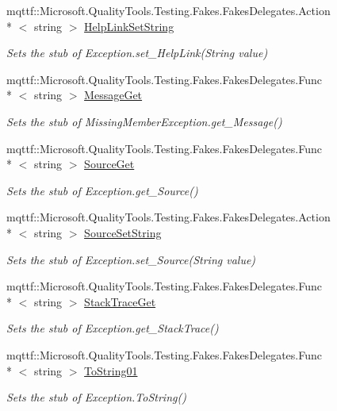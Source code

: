 \begin{DoxyCompactItemize}
mqttf\-::\-Microsoft.\-Quality\-Tools.\-Testing.\-Fakes.\-Fakes\-Delegates.\-Action\\*
$<$ string $>$ \hyperlink{class_system_1_1_fakes_1_1_stub_missing_member_exception_a69763328ffc3aea2fb6e02c0e23f6cc1}{Help\-Link\-Set\-String}
\begin{DoxyCompactList}\small\item\em Sets the stub of Exception.\-set\-\_\-\-Help\-Link(\-String value)\end{DoxyCompactList}\item 
mqttf\-::\-Microsoft.\-Quality\-Tools.\-Testing.\-Fakes.\-Fakes\-Delegates.\-Func\\*
$<$ string $>$ \hyperlink{class_system_1_1_fakes_1_1_stub_missing_member_exception_a75b800fc5f536649bbafb0e673e11ea7}{Message\-Get}
\begin{DoxyCompactList}\small\item\em Sets the stub of Missing\-Member\-Exception.\-get\-\_\-\-Message()\end{DoxyCompactList}\item 
mqttf\-::\-Microsoft.\-Quality\-Tools.\-Testing.\-Fakes.\-Fakes\-Delegates.\-Func\\*
$<$ string $>$ \hyperlink{class_system_1_1_fakes_1_1_stub_missing_member_exception_a4cbfa7a14df58a52470b7b51cec38220}{Source\-Get}
\begin{DoxyCompactList}\small\item\em Sets the stub of Exception.\-get\-\_\-\-Source()\end{DoxyCompactList}\item 
mqttf\-::\-Microsoft.\-Quality\-Tools.\-Testing.\-Fakes.\-Fakes\-Delegates.\-Action\\*
$<$ string $>$ \hyperlink{class_system_1_1_fakes_1_1_stub_missing_member_exception_a61f47a4ec94638d253e068b3ad78df64}{Source\-Set\-String}
\begin{DoxyCompactList}\small\item\em Sets the stub of Exception.\-set\-\_\-\-Source(\-String value)\end{DoxyCompactList}\item 
mqttf\-::\-Microsoft.\-Quality\-Tools.\-Testing.\-Fakes.\-Fakes\-Delegates.\-Func\\*
$<$ string $>$ \hyperlink{class_system_1_1_fakes_1_1_stub_missing_member_exception_ac0aafb803848199abf745416fe8e0b7d}{Stack\-Trace\-Get}
\begin{DoxyCompactList}\small\item\em Sets the stub of Exception.\-get\-\_\-\-Stack\-Trace()\end{DoxyCompactList}\item 
mqttf\-::\-Microsoft.\-Quality\-Tools.\-Testing.\-Fakes.\-Fakes\-Delegates.\-Func\\*
$<$ string $>$ \hyperlink{class_system_1_1_fakes_1_1_stub_missing_member_exception_aadd7e498258a56ee6641300edb4a5257}{To\-String01}
\begin{DoxyCompactList}\small\item\em Sets the stub of Exception.\-To\-String()\end{DoxyCompactList}\end{DoxyCompactItemize}
